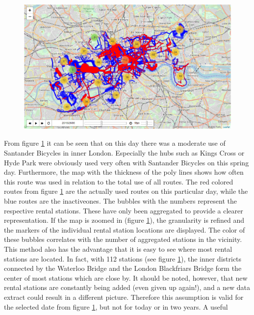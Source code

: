 \begin{figure}[H]
\hspace{-1.6cm}
\includegraphics[width=1.2\textwidth]{img/figure4_folium_plot1}\label{fig:figure4_folium_plot1}
\label{fig:figure4_folium_plot1}
\end{figure}
From figure \ref{fig:figure4_folium_plot1} it can be seen that on this day there was a moderate use of Santander Bicycles in
inner London. Especially the hubs such as Kings Cross or Hyde Park were obviously used very
often with Santander Bicycles on this spring day. Furthermore, the map with the thickness of the
poly lines shows how often this route was used in relation to the total use of all routes. The red
colored routes from figure \ref{fig:figure4_folium_plot1} are the actually used routes on this particular day, while the blue
routes are the \glqq inactive\grqq ones. The bubbles with the numbers represent the respective rental
stations. These have only been aggregated to provide a clearer representation. If the map is
zoomed in (figure \ref{fig:figure4_folium_plot1}), the granularity is refined and the markers of the individual rental station
locations are displayed. The color of these bubbles correlates with the number of aggregated
stations in the vicinity. This method also has the advantage that it is easy to see where most rental
stations are located. In fact, with 112 stations (see figure \ref{fig:figure4_folium_plot1}), the inner districts connected by the
Waterloo Bridge and the London Blackfriars Bridge form the center of most stations which are
close by. It should be noted, however, that new rental stations are constantly being added (even
given up again!), and a new data extract could result in a different picture. Therefore this assumption is valid for the selected date from figure \ref{fig:figure4_folium_plot1}, but not for today or in two years. A useful
